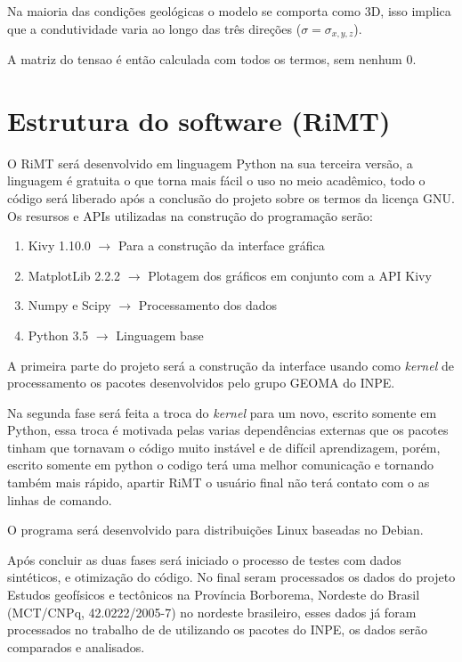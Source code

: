 	    Na maioria das condições geológicas o modelo se comporta como 3D, isso implica que a 
	    condutividade varia ao longo das três direções ($\sigma = \sigma_{x,y,z}$).
	    
	    A matriz do tensao é então calculada com todos os termos, sem nenhum 0.
	    
	\section{Estrutura do software (RiMT)}
	    \label{rimt}

	    O RiMT será desenvolvido em linguagem Python na sua terceira versão, a
	    linguagem é gratuita o que torna mais fácil o uso no meio acadêmico, todo
	    o código será liberado após a conclusão do projeto sobre os termos da licença
	    GNU. 
	    Os resursos e APIs utilizadas na construção do programação serão:
	    
	    \begin{enumerate}
		\item Kivy 1.10.0 $\rightarrow$ Para a construção da interface gráfica
		\item MatplotLib 2.2.2 $\rightarrow$ Plotagem dos gráficos em conjunto com a API Kivy
		\item Numpy e Scipy $\rightarrow$ Processamento dos dados
		\item Python 3.5 $\rightarrow$ Linguagem base 
	    \end{enumerate}

	    A primeira parte do projeto será a construção da interface usando como \textit{kernel}
	    de processamento os pacotes desenvolvidos pelo grupo GEOMA \citeauthor{geoma} do INPE.
	    
	    Na segunda fase será feita a troca do \textit{kernel} para um novo, escrito
	    somente em Python, essa troca é motivada pelas varias dependências externas que os 
	    pacotes tinham que tornavam o código muito instável e de difícil aprendizagem, porém,
	    escrito somente em python o codigo terá uma melhor comunicação e tornando também 
	    mais rápido, apartir RiMT o usuário final não terá contato com o as linhas de comando.
	    
	    O programa será desenvolvido para distribuições Linux baseadas no Debian. 
	    
	    Após concluir as duas fases será iniciado o processo de testes com dados
	    sintéticos, e otimização do código. No final seram processados
	    os dados do projeto Estudos geofísicos e tectônicos na Província Borborema,
	    Nordeste do Brasil (MCT/CNPq, 42.0222/2005-7) no nordeste brasileiro, esses dados
	    já foram processados no trabalho de \citeauthor{tese_andrea} de \citeyearpar{tese_andrea}
	    utilizando os pacotes do INPE, os dados serão comparados e analisados.
